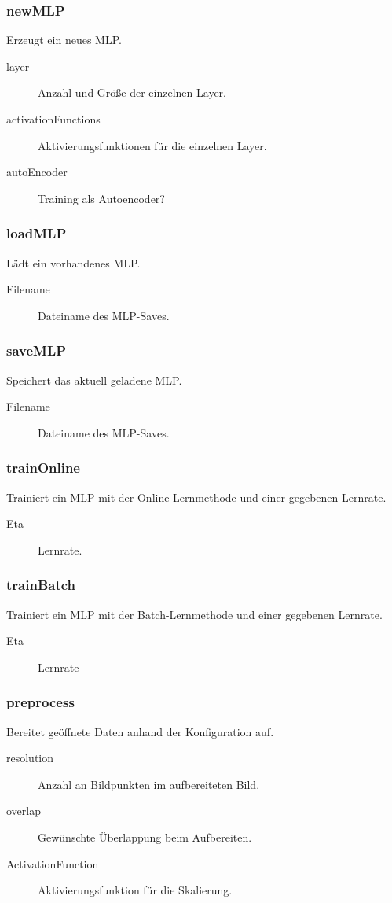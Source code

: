 \documentclass[a4paper,10pt]{scrartcl}
\begin{document}
\subsubsection{newMLP}
Erzeugt ein neues MLP.
\begin{description}
 \item[layer] Anzahl und Größe der einzelnen Layer.
 \item[activationFunctions] Aktivierungsfunktionen für die einzelnen Layer.
 \item[autoEncoder] Training als Autoencoder?
\end{description}
\subsubsection{loadMLP}
Lädt ein vorhandenes MLP.
\begin{description}
 \item[Filename] Dateiname des MLP-Saves.
\end{description}
\subsubsection{saveMLP}
Speichert das aktuell geladene MLP.
\begin{description}
 \item[Filename] Dateiname des MLP-Saves.
\end{description}
\subsubsection{trainOnline}
Trainiert ein MLP mit der Online-Lernmethode und einer gegebenen Lernrate.
\begin{description}
 \item[Eta] Lernrate.
\end{description}
\subsubsection{trainBatch}
Trainiert ein MLP mit der Batch-Lernmethode und einer gegebenen Lernrate.
\begin{description}
 \item[Eta] Lernrate
\end{description}
\subsubsection{preprocess}
Bereitet geöffnete Daten anhand der Konfiguration auf.
\begin{description}
 \item[resolution] Anzahl an Bildpunkten im aufbereiteten Bild.
 \item[overlap] Gewünschte Überlappung beim Aufbereiten.
 \item[ActivationFunction] Aktivierungsfunktion für die Skalierung.
\end{description}
\end{document}
